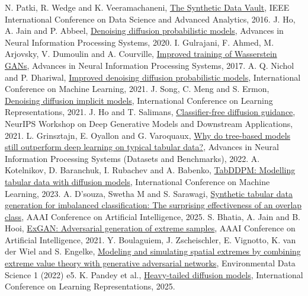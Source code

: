\documentclass[12pt,a4paper]{report}
\newcommand{\reflink}[2]{\href{#1}{\textcolor{linkblue}{#2}}}
\begin{document}
{\begin{thebibliography}{99}
 N. Patki, R. Wedge and K. Veeramachaneni, \reflink{https://doi.org/10.1109/DSAA.2016.49}{The Synthetic Data Vault}, IEEE International Conference on Data Science and Advanced Analytics, 2016.
 J. Ho, A. Jain and P. Abbeel, \reflink{https://arxiv.org/abs/2006.11239}{Denoising diffusion probabilistic models}, Advances in Neural Information Processing Systems, 2020.
 I. Gulrajani, F. Ahmed, M. Arjovsky, V. Dumoulin and A. Courville, \reflink{https://arxiv.org/abs/1704.00028}{Improved training of Wasserstein GANs}, Advances in Neural Information Processing Systems, 2017.
 A. Q. Nichol and P. Dhariwal, \reflink{https://arxiv.org/abs/2102.09672}{Improved denoising diffusion probabilistic models}, International Conference on Machine Learning, 2021.
 J. Song, C. Meng and S. Ermon, \reflink{https://arxiv.org/abs/2010.02502}{Denoising diffusion implicit models}, International Conference on Learning Representations, 2021.
 J. Ho and T. Salimans, \reflink{https://arxiv.org/abs/2207.12598}{Classifier-free diffusion guidance}, NeurIPS Workshop on Deep Generative Models and Downstream Applications, 2021.
 L. Grinsztajn, E. Oyallon and G. Varoquaux, \reflink{https://arxiv.org/abs/2207.08815}{Why do tree-based models still outperform deep learning on typical tabular data?}, Advances in Neural Information Processing Systems (Datasets and Benchmarks), 2022.
 A. Kotelnikov, D. Baranchuk, I. Rubachev and A. Babenko, \reflink{https://arxiv.org/abs/2209.15421}{TabDDPM: Modelling tabular data with diffusion models}, International Conference on Machine Learning, 2023.
 A. D'souza, Swetha M and S. Sarawagi, \reflink{https://arxiv.org/abs/2412.15657}{Synthetic tabular data generation for imbalanced classification: The surprising effectiveness of an overlap class}, AAAI Conference on Artificial Intelligence, 2025.
 S. Bhatia, A. Jain and B. Hooi, \reflink{https://arxiv.org/abs/2009.08454}{ExGAN: Adversarial generation of extreme samples}, AAAI Conference on Artificial Intelligence, 2021.
 Y. Boulaguiem, J. Zscheischler, E. Vignotto, K. van der Wiel and S. Engelke, \reflink{https://arxiv.org/abs/2111.00267}{Modeling and simulating spatial extremes by combining extreme value theory with generative adversarial networks}, Environmental Data Science 1 (2022) e5.
 K. Pandey et al., \reflink{https://arxiv.org/abs/2410.14171}{Heavy-tailed diffusion models}, International Conference on Learning Representations, 2025.

\end{thebibliography}}
\end{document}
